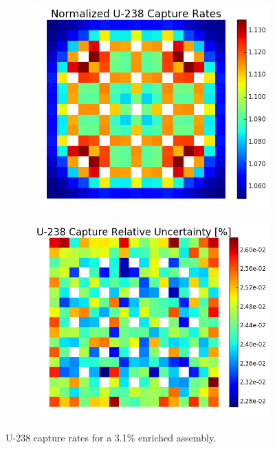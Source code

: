 \begin{figure}[h!]
\centering
\begin{subfigure}{0.44\textwidth}
  \centering
  \includegraphics[width=\linewidth]{figures/benchmarks/capture-rates/capt-mean-assm-31}
  \caption{}
  \label{fig:chap7-capt-rate-mean-3.1-assm}
\end{subfigure}%
\begin{subfigure}{0.44\textwidth}
  \centering
  \includegraphics[width=\linewidth]{figures/benchmarks/capture-rates/capt-rel-err-assm-31}
  \caption{}
  \label{fig:chap7-capt-rate-rel-err-3.1-assm}
\end{subfigure}%
\caption[U-238 capture rates for a 3.1\% enriched assembly]{U-238 capture rates for a 3.1\% enriched assembly.}
\label{fig:chap7-capt-rates-3.1-assm}
\end{figure}

